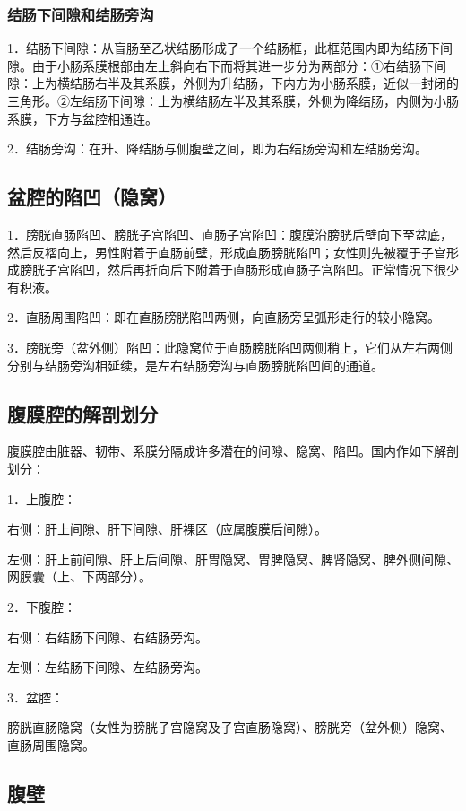 \subsubsection{结肠下间隙和结肠旁沟}

1．结肠下间隙：从盲肠至乙状结肠形成了一个结肠框，此框范围内即为结肠下间隙。由于小肠系膜根部由左上斜向右下而将其进一步分为两部分：①右结肠下间隙：上为横结肠右半及其系膜，外侧为升结肠，下内方为小肠系膜，近似一封闭的三角形。②左结肠下间隙：上为横结肠左半及其系膜，外侧为降结肠，内侧为小肠系膜，下方与盆腔相通连。

2．结肠旁沟：在升、降结肠与侧腹壁之间，即为右结肠旁沟和左结肠旁沟。

\subsection{盆腔的陷凹（隐窝）}

1．膀胱直肠陷凹、膀胱子宫陷凹、直肠子宫陷凹：腹膜沿膀胱后壁向下至盆底，然后反褶向上，男性附着于直肠前壁，形成直肠膀胱陷凹；女性则先被覆于子宫形成膀胱子宫陷凹，然后再折向后下附着于直肠形成直肠子宫陷凹。正常情况下很少有积液。

2．直肠周围陷凹：即在直肠膀胱陷凹两侧，向直肠旁呈弧形走行的较小隐窝。

3．膀胱旁（盆外侧）陷凹：此隐窝位于直肠膀胱陷凹两侧稍上，它们从左右两侧分别与结肠旁沟相延续，是左右结肠旁沟与直肠膀胱陷凹间的通道。

\subsection{腹膜腔的解剖划分}

腹膜腔由脏器、韧带、系膜分隔成许多潜在的间隙、隐窝、陷凹。国内作如下解剖划分：

1．上腹腔：

右侧：肝上间隙、肝下间隙、肝裸区（应属腹膜后间隙）。

左侧：肝上前间隙、肝上后间隙、肝胃隐窝、胃脾隐窝、脾肾隐窝、脾外侧间隙、网膜囊（上、下两部分）。

2．下腹腔：

右侧：右结肠下间隙、右结肠旁沟。

左侧：左结肠下间隙、左结肠旁沟。

3．盆腔：

膀胱直肠隐窝（女性为膀胱子宫隐窝及子宫直肠隐窝）、膀胱旁（盆外侧）隐窝、直肠周围隐窝。

\subsection{腹壁}

